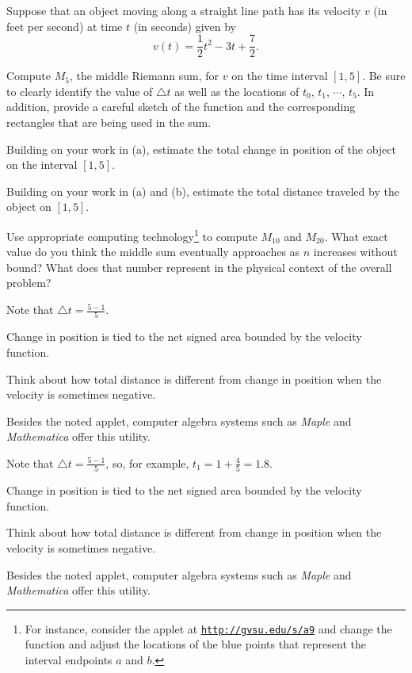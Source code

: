 \begin{activity} \label{A:4.2.3}  Suppose that an object moving along a straight line path has its velocity $v$ (in feet per second) at time $t$ (in seconds) given by 
$$v(t) = \frac{1}{2}t^2 - 3t + \frac{7}{2}.$$
\ba
	\item Compute $M_5$, the middle Riemann sum, for $v$ on the time interval $[1,5]$.  Be sure to clearly identify the value of $\triangle t$ as well as the locations of $t_0$, $t_1$, $\cdots$, $t_5$.  In addition, provide a careful sketch of the function and the corresponding rectangles that are being used in the sum.
	\item Building on your work in (a), estimate the total change in position of the object on the interval $[1,5]$.
	\item Building on your work in (a) and (b), estimate the total distance traveled by the object on $[1,5]$.
	\item Use appropriate computing technology\footnote{For instance, consider the applet at \href{http://gvsu.edu/s/a9}{\texttt{http://gvsu.edu/s/a9}} and change the function and adjust the locations of the blue points that represent the interval endpoints $a$ and $b$.} to compute $M_{10}$ and $M_{20}$.  What exact value do you think the middle sum eventually approaches as $n$ increases without bound?  What does that number represent in the physical context of the overall problem?
	
\ea
\end{activity}
\begin{smallhint}
\ba
	\item Note that $\triangle t = \frac{5-1}{5}$.
	\item Change in position is tied to the net signed area bounded by the velocity function.
	\item Think about how total distance is different from change in position when the velocity is sometimes negative.
	\item Besides the noted applet, computer algebra systems such as \emph{Maple} and \emph{Mathematica} offer this utility.
\ea
\end{smallhint}
\begin{bighint}
\ba
	\item Note that $\triangle t = \frac{5-1}{5}$, so, for example, $t_1 = 1 + \frac{4}{5} = 1.8$.
	\item Change in position is tied to the net signed area bounded by the velocity function.
	\item Think about how total distance is different from change in position when the velocity is sometimes negative.
	\item Besides the noted applet, computer algebra systems such as \emph{Maple} and \emph{Mathematica} offer this utility.
\ea
\end{bighint}
